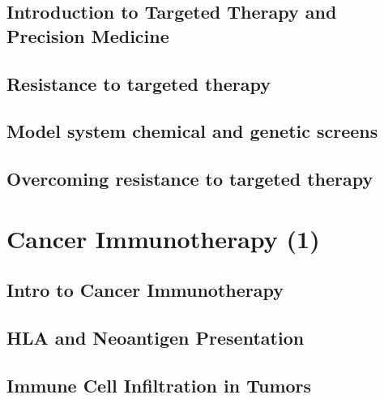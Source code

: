 \documentclass[
]{book}
\begin{document}
\hypertarget{introduction-to-targeted-therapy-and-precision-medicine}{%
\section{Introduction to Targeted Therapy and Precision Medicine}\label{introduction-to-targeted-therapy-and-precision-medicine}}

\hypertarget{resistance-to-targeted-therapy}{%
\section{Resistance to targeted therapy}\label{resistance-to-targeted-therapy}}

\hypertarget{model-system-chemical-and-genetic-screens}{%
\section{Model system chemical and genetic screens}\label{model-system-chemical-and-genetic-screens}}

\hypertarget{overcoming-resistance-to-targeted-therapy}{%
\section{Overcoming resistance to targeted therapy}\label{overcoming-resistance-to-targeted-therapy}}

\hypertarget{cancerimmuno1}{%
\chapter{Cancer Immunotherapy (1)}\label{cancerimmuno1}}

\hypertarget{intro-to-cancer-immunotherapy}{%
\section{Intro to Cancer Immunotherapy}\label{intro-to-cancer-immunotherapy}}

\hypertarget{hla-and-neoantigen-presentation}{%
\section{HLA and Neoantigen Presentation}\label{hla-and-neoantigen-presentation}}

\hypertarget{immune-cell-infiltration-in-tumors}{%
\section{Immune Cell Infiltration in Tumors}\label{immune-cell-infiltration-in-tumors}}
\end{document}
